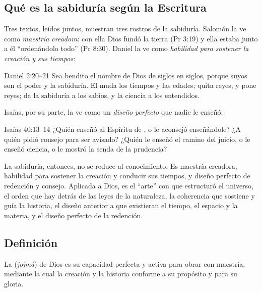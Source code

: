 \subsection{Qué es la sabiduría según la Escritura}

Tres textos, leídos juntos, muestran tres rostros de la sabiduría. Salomón la ve como \emph{maestría creadora}: con ella Dios fundó la tierra (Pr 3:19) y ella estaba junto a él ``ordenándolo todo'' (Pr 8:30). Daniel la ve como \emph{habilidad para sostener la creación y sus tiempos}:

\begin{verso}{Daniel 2:20–21}
Sea bendito el nombre de Dios de siglos en siglos, porque suyos son el poder y la sabiduría. El muda los tiempos y las edades; quita reyes, y pone reyes; da la sabiduría a los sabios, y la ciencia a los entendidos.
\end{verso}

Isaías, por su parte, la ve como un \emph{diseño perfecto} que nadie le enseñó:

\begin{verso}{Isaías 40:13–14}
¿Quién enseñó al Espíritu de \SENOR, o le aconsejó enseñándole? ¿A quién pidió consejo para ser avisado? ¿Quién le enseñó el camino del juicio, o le enseñó ciencia, o le mostró la senda de la prudencia?
\end{verso}

La sabiduría, entonces, no se reduce al conocimiento. Es maestría creadora, habilidad para sostener la creación y conducir sus tiempos, y diseño perfecto de redención y consejo. Aplicada a Dios, es el ``arte'' con que estructuró el universo, el orden que hay detrás de las leyes de la naturaleza, la coherencia que sostiene y guía la historia, el diseño anterior a que existieran el tiempo, el espacio y la materia, y el diseño perfecto de la redención.

\subsection{Definición}

\begin{tcolorbox}[colback=papiro,colframe=azul,boxrule=1pt,arc=3pt]
La  (\emph{jojmá}) de Dios es su capacidad perfecta y activa para obrar con maestría, mediante la cual  la creación y la historia conforme a su propósito y para su gloria.
\end{tcolorbox}

